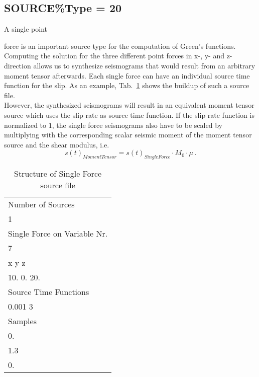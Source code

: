 \documentclass[12pt,twoside]{article}
\begin{document}
\subsection{SOURCE\%Type = 20}
\hypertarget{src20}{A single point} force is an important source type for the computation of Green's functions.
Computing the solution for the three different point forces in x-, y- and z-direction allows us to synthesize seismograms 
that would result from an arbitrary moment tensor afterwards.
Each single force can have an individual source time function for the slip.
As an example, Tab.~\ref{SF-source-file} shows the buildup of such a source file.\\
However, the synthesized seismograms will result in an equivalent moment tensor source which uses the slip rate as source
time function.
If the slip rate function is normalized to $1$, the single force seismograms also have to be scaled
by multiplying with the corresponding scalar seismic moment of the moment tensor source and the shear modulus, i.e.
\begin{equation}
s(t)_{Moment Tensor} = s(t)_{Single Force} \cdot M_0 \cdot \mu\,.
\end{equation}

\begin{table}
\caption{Structure of Single Force source file}
\begin{center}
\begin{tabular}{l}
\hline
Number of Sources\\
1\\
Single Force on Variable Nr.\\
7\\
x \hspace{4mm} y \hspace{4mm} z \hspace{4mm} \\
10. \hspace{0.5mm} 0. \hspace{2mm} 20.\\
Source Time Functions\\
0.001\hspace{6mm} 3\\
Samples\\
0.\\
1.3\\
0.\\
\hline
\end{tabular}
\end{center}
\label{SF-source-file}
\end{table}
\end{document}
